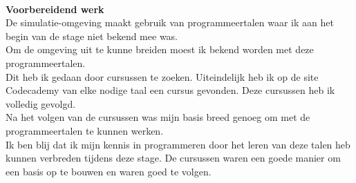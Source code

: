 \documentclass[12pt, letterpaper]{article}
\begin{document}
\begin{appendices}
\\
\textbf{Voorbereidend werk} \\
De simulatie-omgeving maakt gebruik van programmeertalen waar ik aan het begin van de stage niet bekend mee was.\\
Om de omgeving uit te kunne breiden moest ik bekend worden met deze programmeertalen.\\
Dit heb ik gedaan door cursussen te zoeken. Uiteindelijk heb ik op de site Codecademy van elke nodige taal een cursus gevonden. Deze cursussen heb ik volledig gevolgd.\\
Na het volgen van de cursussen was mijn basis breed genoeg om met de programmeertalen te kunnen werken.\\
Ik ben blij dat ik mijn kennis in programmeren door het leren van deze talen heb kunnen verbreden tijdens deze stage. De cursussen waren een goede manier om een basis op te bouwen en waren goed te volgen.


\end{appendices}
\end{document}
